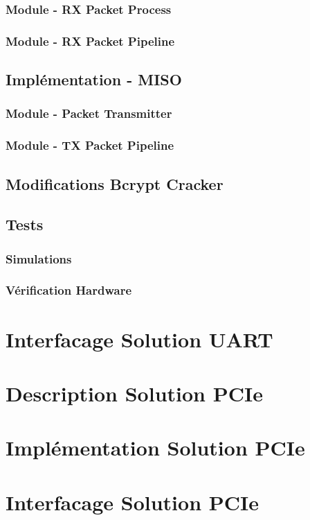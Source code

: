 \subsubsection{Module - RX Packet Process}
\subsubsection{Module - RX Packet Pipeline}

\subsection{Implémentation - MISO}
\subsubsection{Module - Packet Transmitter}
\subsubsection{Module - TX Packet Pipeline}

\subsection{Modifications Bcrypt Cracker}

\subsection{Tests}
\subsubsection{Simulations}
\subsubsection{Vérification Hardware}

\section{Interfacage Solution UART}

\newpage

\section{Description Solution PCIe}
\section{Implémentation Solution PCIe}
\section{Interfacage Solution PCIe}
